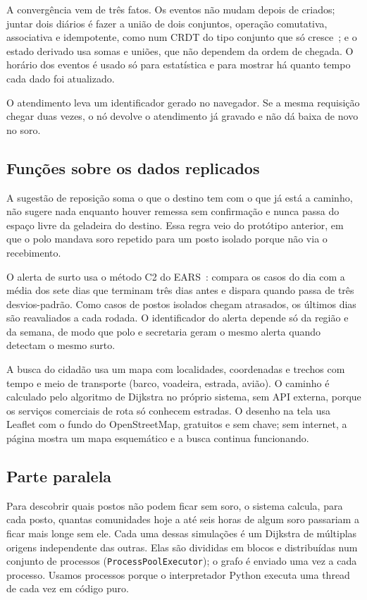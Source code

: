\documentclass[a4paper,12pt]{article}
\begin{document}
A convergência vem de três fatos. Os eventos não mudam depois de criados; juntar dois
diários é fazer a união de dois conjuntos, operação comutativa, associativa e idempotente,
como num CRDT do tipo conjunto que só cresce~\cite{shapiro2011}; e o estado derivado usa
somas e uniões, que não dependem da ordem de chegada. O horário dos eventos é usado só para
estatística e para mostrar há quanto tempo cada dado foi atualizado.

O atendimento leva um identificador gerado no navegador. Se a mesma requisição chegar duas
vezes, o nó devolve o atendimento já gravado e não dá baixa de novo no soro.

\subsection{Funções sobre os dados replicados}

A sugestão de reposição soma o que o destino tem com o que já está a caminho, não sugere
nada enquanto houver remessa sem confirmação e nunca passa do espaço livre da geladeira do
destino. Essa regra veio do protótipo anterior, em que o polo mandava soro repetido para
um posto isolado porque não via o recebimento.

O alerta de surto usa o método C2 do EARS~\cite{hutwagner2003}: compara os casos do dia com
a média dos sete dias que terminam três dias antes e dispara quando passa de três
desvios-padrão. Como casos de postos isolados chegam atrasados, os últimos dias são
reavaliados a cada rodada. O identificador do alerta depende só da região e da semana, de
modo que polo e secretaria geram o mesmo alerta quando detectam o mesmo surto.

A busca do cidadão usa um mapa com localidades, coordenadas e trechos com tempo e meio de
transporte (barco, voadeira, estrada, avião). O caminho é calculado pelo algoritmo de
Dijkstra no próprio sistema, sem API externa, porque os serviços comerciais de rota só
conhecem estradas. O desenho na tela usa Leaflet com o fundo do OpenStreetMap, gratuitos e
sem chave; sem internet, a página mostra um mapa esquemático e a busca continua funcionando.

\subsection{Parte paralela}

Para descobrir quais postos não podem ficar sem soro, o sistema calcula, para cada posto,
quantas comunidades hoje a até seis horas de algum soro passariam a ficar mais longe sem
ele. Cada uma dessas simulações é um Dijkstra de múltiplas origens independente das
outras. Elas são divididas em blocos e distribuídas num conjunto de processos
(\texttt{ProcessPoolExecutor}); o grafo é enviado uma vez a cada processo. Usamos
processos porque o interpretador Python executa uma thread de cada vez em código puro.
\end{document}
